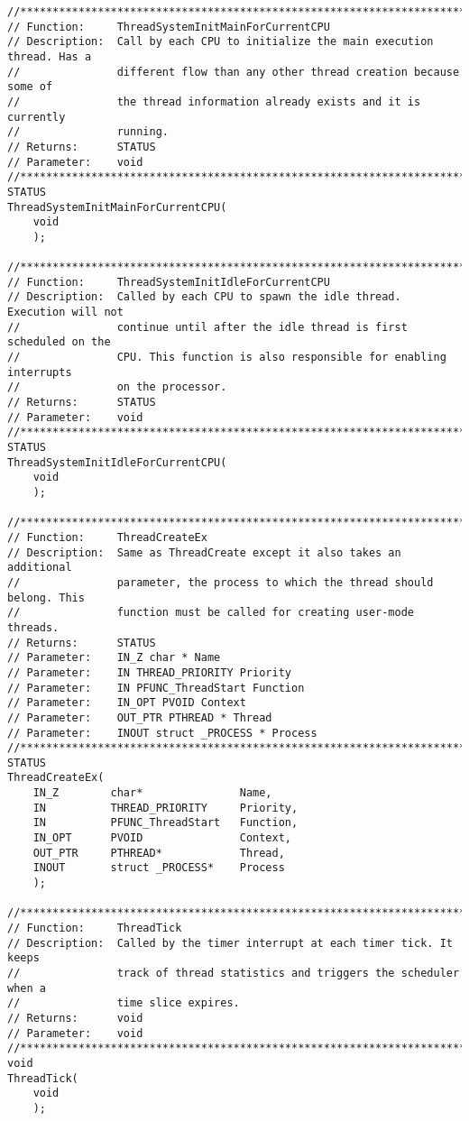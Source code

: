 \begin{appendices}
\begin{lstlisting}[caption={Thread Private Interface},label={lst:ThPrivateFuncs}]
//******************************************************************************
// Function:     ThreadSystemInitMainForCurrentCPU
// Description:  Call by each CPU to initialize the main execution thread. Has a
//               different flow than any other thread creation because some of
//               the thread information already exists and it is currently
//               running.
// Returns:      STATUS
// Parameter:    void
//******************************************************************************
STATUS
ThreadSystemInitMainForCurrentCPU(
    void
    );

//******************************************************************************
// Function:     ThreadSystemInitIdleForCurrentCPU
// Description:  Called by each CPU to spawn the idle thread. Execution will not
//               continue until after the idle thread is first scheduled on the
//               CPU. This function is also responsible for enabling interrupts
//               on the processor.
// Returns:      STATUS
// Parameter:    void
//******************************************************************************
STATUS
ThreadSystemInitIdleForCurrentCPU(
    void
    );

//******************************************************************************
// Function:     ThreadCreateEx
// Description:  Same as ThreadCreate except it also takes an additional
//               parameter, the process to which the thread should belong. This
//               function must be called for creating user-mode threads.
// Returns:      STATUS
// Parameter:    IN_Z char * Name
// Parameter:    IN THREAD_PRIORITY Priority
// Parameter:    IN PFUNC_ThreadStart Function
// Parameter:    IN_OPT PVOID Context
// Parameter:    OUT_PTR PTHREAD * Thread
// Parameter:    INOUT struct _PROCESS * Process
//******************************************************************************
STATUS
ThreadCreateEx(
    IN_Z        char*               Name,
    IN          THREAD_PRIORITY     Priority,
    IN          PFUNC_ThreadStart   Function,
    IN_OPT      PVOID               Context,
    OUT_PTR     PTHREAD*            Thread,
    INOUT       struct _PROCESS*    Process
    );

//******************************************************************************
// Function:     ThreadTick
// Description:  Called by the timer interrupt at each timer tick. It keeps
//               track of thread statistics and triggers the scheduler when a
//               time slice expires.
// Returns:      void
// Parameter:    void
//******************************************************************************
void
ThreadTick(
    void
    );


\end{lstlisting}
\end{appendices}
